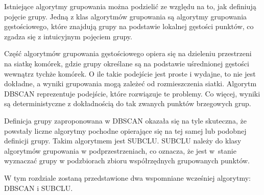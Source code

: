 Istniejące algorytmy grupowania można podzielić ze względu na to, jak definiują pojęcie grupy. Jedną z klas algorytmów grupowania są algorytmy grupowania gęstościowego, które znajdują grupy na podstawie lokalnej gęstości punktów, co zgadza się z intuicyjnym pojęciem grupy.

Część algorytmów grupowania gęstościowego opiera się na dzieleniu przestrzeni na siatkę komórek, gdzie grupy określane są na podstawie uśrednionej gęstości wewnątrz tychże komórek. O ile takie podejście jest proste i wydajne, to nie jest dokładne, a wyniki grupowania mogą zależeć od rozmieszczenia siatki. Algorytm DBSCAN reprezentuje podejście, które rozwiązuje te problemy. Co więcej, wyniki są deterministyczne z dokładnością do tak zwanych punktów brzegowych grup.\par
Definicja grupy zaproponowana w DBSCAN okazała się na tyle skuteczna, że powstały liczne algorytmy pochodne opierające się na tej samej lub podobnej definicji grupy. Takim algorytmem jest SUBCLU. SUBCLU należy do klasy algorytmów grupowania w podprzestrzeniach, co oznacza, że jest \mbox{w stanie} wyznaczać grupy w podzbiorach zbioru współrzędnych grupowanych punktów.\par
W tym rozdziale zostaną przedstawione dwa wspomniane wcześniej algorytmy: DBSCAN i SUBCLU.